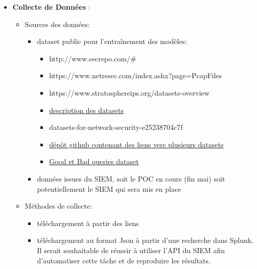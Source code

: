 \documentclass[
  letterpaper,
  DIV=11,
  numbers=noendperiod]{scrartcl}
\providecommand{\tightlist}{%
  \setlength{\itemsep}{0pt}\setlength{\parskip}{0pt}}\usepackage{longtable,booktabs,array}
\begin{document}
\begin{itemize}
\tightlist
\item
  \textbf{Collecte de Données} :

  \begin{itemize}
  \tightlist
  \item
    Sources des données:

    \begin{itemize}
    \tightlist
    \item
      dataset public pour l'entraînement des modèles:

      \begin{itemize}
      \tightlist
      \item
        http://www.secrepo.com/\#
      \item
        https://www.netresec.com/index.ashx?page=PcapFiles
      \item
        https://www.stratosphereips.org/datasets-overview
      \item
        \href{https://medium.com/@dylan.d.zheng/}{description des
        datasets}
      \item
        datasets-for-network-security-e25238704c7f
      \item
        \href{https://github.com/jivoi/awesome-ml-for-cybersecurity?tab=readme-ov-file}{dépôt
        github contenant des liens vers plusieurs datasets}
      \item
        \href{https://github.com/faizann24/Fwaf-Machine-Learning-driven-Web-Application-Firewall/tree/master}{Good
        et Bad queries dataset}
      \end{itemize}
    \item
      données issues du SIEM, soit le POC en cours (fin mai) soit
      potentiellement le SIEM qui sera mis en place
    \end{itemize}
  \item
    Méthodes de collecte:

    \begin{itemize}
    \tightlist
    \item
      téléchargement à partir des liens
    \item
      téléchargement au format Json à partir d'une recherche dans
      Splunk. Il serait souhaitable de réussir à utiliser l'API du SIEM
      afin d'automatiser cette tâche et de reproduire les résultats.
    \end{itemize}
  \end{itemize}
\end{itemize}
\end{document}
